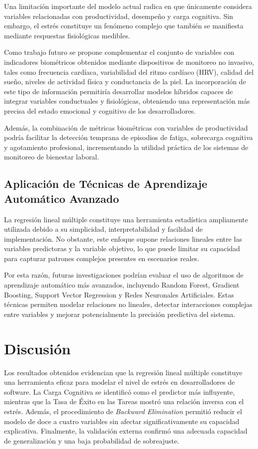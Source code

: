 \documentclass[conference]{IEEEtran}
\begin{document}
Una limitación importante del modelo actual radica en que
únicamente considera variables relacionadas con productividad,
desempeño y carga cognitiva. Sin embargo, el estrés constituye
un fenómeno complejo que también se manifiesta mediante
respuestas fisiológicas medibles.

Como trabajo futuro se propone complementar el conjunto de
variables con indicadores biométricos obtenidos mediante
dispositivos de monitoreo no invasivo, tales como frecuencia
cardíaca, variabilidad del ritmo cardíaco (HRV), calidad del
sueño, niveles de actividad física y conductancia de la piel.
La incorporación de este tipo de información permitiría
desarrollar modelos híbridos capaces de integrar variables
conductuales y fisiológicas, obteniendo una representación más
precisa del estado emocional y cognitivo de los desarrolladores.

Además, la combinación de métricas biométricas con variables
de productividad podría facilitar la detección temprana de
episodios de fatiga, sobrecarga cognitiva y agotamiento
profesional, incrementando la utilidad práctica de los sistemas
de monitoreo de bienestar laboral.

\subsection{Aplicación de Técnicas de Aprendizaje Automático Avanzado}

La regresión lineal múltiple constituye una herramienta
estadística ampliamente utilizada debido a su simplicidad,
interpretabilidad y facilidad de implementación. No obstante,
este enfoque supone relaciones lineales entre las variables
predictoras y la variable objetivo, lo que puede limitar su
capacidad para capturar patrones complejos presentes en
escenarios reales.

Por esta razón, futuras investigaciones podrían evaluar el uso
de algoritmos de aprendizaje automático más avanzados,
incluyendo Random Forest, Gradient Boosting, Support Vector
Regression y Redes Neuronales Artificiales. Estas técnicas
permiten modelar relaciones no lineales, detectar interacciones
complejas entre variables y mejorar potencialmente la precisión
predictiva del sistema.

\section{Discusión}

Los resultados obtenidos evidencian que la regresión lineal
múltiple constituye una herramienta eficaz para modelar el
nivel de estrés en desarrolladores de software. La Carga
Cognitiva se identificó como el predictor más influyente,
mientras que la Tasa de Éxito en las Tareas mostró una
relación inversa con el estrés. Además, el procedimiento de
\textit{Backward Elimination} permitió reducir el modelo de
doce a cuatro variables sin afectar significativamente su
capacidad explicativa. Finalmente, la validación externa
confirmó una adecuada capacidad de generalización y una baja
probabilidad de sobreajuste.
\end{document}

